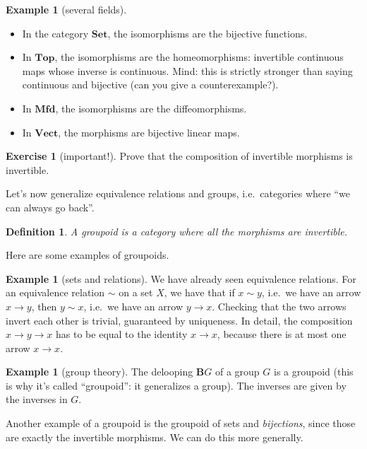 \documentclass[12pt,oneside]{scrbook}
\numberwithin{equation}{section}
\theoremstyle{plain}
\newtheorem{deph}[thm]{Definition}
\theoremstyle{definition}
\newtheorem{eg}[thm]{Example}
\newtheorem{ex}[thm]{Exercise}
\newcommand{\cat}[1]{{\mathbf{#1}}} %
\newcommand{\B}{\cat{B}} %
\newcommand{\Set}{\cat{Set}}
\newcommand{\Vect}{\cat{Vect}}
\DeclareMathOperator{\1}{\mathbbm{1}}
\DeclareMathOperator{\2}{\mathbbm{2}}
\begin{document}
\begin{eg}[several fields]
\phantom{newline}
 \begin{itemize}
  \item In the category $\Set$, the isomorphisms are the bijective functions.
  \item In $\cat{Top}$, the isomorphisms are the homeomorphisms: invertible continuous maps whose inverse is continuous. Mind: this is strictly stronger than saying continuous and bijective (can you give a counterexample?).
  \item In $\cat{Mfd}$, the isomorphisms are the diffeomorphisms.
  \item In $\Vect$, the morphisms are bijective linear maps.
 \end{itemize}
\end{eg}

\begin{ex}[important!]
 Prove that the composition of invertible morphisms is invertible.
\end{ex}

Let's now generalize equivalence relations and groups, i.e.~categories where ``we can always go back''.

\begin{deph}
 A \emph{groupoid} is a category where all the morphisms are invertible.
\end{deph}

Here are some examples of groupoids. 

\begin{eg}[sets and relations]
 We have already seen equivalence relations. For an equivalence relation $\sim$ on a set $X$, we have that if $x\sim y$, i.e.~we have an arrow $x\to y$, then $y\sim x$, i.e.~we have an arrow $y\to x$. Checking that the two arrows invert each other is trivial, guaranteed by uniqueness. In detail, the composition $x\to y \to x$ has to be equal to the identity $x\to x$, because there is at most one arrow $x\to x$.
\end{eg}

\begin{eg}[group theory]
 The delooping $\B G$ of a group $G$ is a groupoid (this is why it's called ``groupoid'': it generalizes a group). The inverses are given by the inverses in $G$.
\end{eg}

Another example of a groupoid is the groupoid of sets and \emph{bijections}, since those are exactly the invertible morphisms. We can do this more generally. 
\end{document}
